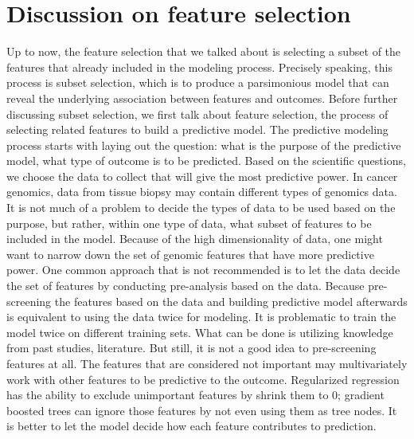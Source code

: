 \section*{Discussion on feature selection}
Up to now, the feature selection that we talked about is selecting a subset of the features that already included in the modeling process. Precisely speaking, this process is subset selection, which is to produce a parsimonious model that can reveal the underlying association between features and outcomes. Before further discussing subset selection, we first talk about feature selection, the process of selecting related features to build a predictive model. The predictive modeling process starts with laying out the question: what is the purpose of the predictive model, what type of outcome is to be predicted. Based on the scientific questions, we choose the data to collect that will give the most predictive power. In cancer genomics, data from tissue biopsy may contain different types of genomics data. It is not much of a problem to decide the types of data to be used based on the purpose, but rather, within one type of data, what subset of features to be included in the model. Because of the high dimensionality of data, one might want to narrow down the set of genomic features that have more predictive power. One common approach that is not recommended is to let the data decide the set of features by conducting pre-analysis based on the data. Because pre-screening the features based on the data and building predictive model afterwards is equivalent to using the data twice for modeling. It is problematic to train the model twice on different training sets. What can be done is utilizing knowledge from past studies, literature. But still, it is not a good idea to pre-screening features at all. The features that are considered not important may multivariately work with other features to be predictive to the outcome. Regularized regression has the ability to exclude unimportant features by shrink them to 0; gradient boosted trees can ignore those features by not even using them as tree nodes. It is better to let the model decide how each feature contributes to prediction.


